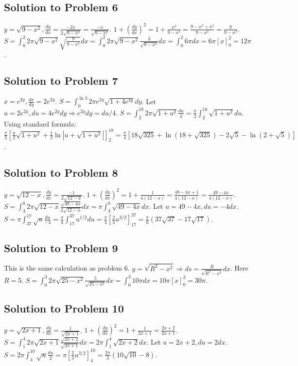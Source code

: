 \documentclass[12pt]{article}
\begin{document}
\subsection*{Solution to Problem 6}
$y=\sqrt{9-x^2}, \frac{dy}{dx}=\frac{-2x}{2\sqrt{9-x^2}}=\frac{-x}{\sqrt{9-x^2}}$.
$1+(\frac{dy}{dx})^2 = 1+\frac{x^2}{9-x^2}=\frac{9-x^2+x^2}{9-x^2}=\frac{9}{9-x^2}$.
$S = \int_0^2 2\pi \sqrt{9-x^2} \sqrt{\frac{9}{9-x^2}} dx = \int_0^2 2\pi \sqrt{9-x^2} \frac{3}{\sqrt{9-x^2}} dx = \int_0^2 6\pi dx = 6\pi[x]_0^2 = 12\pi$.

\subsection*{Solution to Problem 7}
$x=e^{2y}, \frac{dx}{dy}=2e^{2y}$. $S = \int_0^{\ln 3} 2\pi e^{2y} \sqrt{1+4e^{4y}} dy$.
Let $u=2e^{2y}, du=4e^{2y}dy \Rightarrow e^{2y}dy = du/4$. $S = \int_{2}^{18} 2\pi \sqrt{1+u^2} \frac{du}{4} = \frac{\pi}{2} \int_2^{18} \sqrt{1+u^2} du$.
Using standard formula: $\frac{\pi}{2} \left[\frac{u}{2}\sqrt{1+u^2} + \frac{1}{2}\ln|u+\sqrt{1+u^2}|\right]_2^{18} = \frac{\pi}{4}[18\sqrt{325}+\ln(18+\sqrt{325}) - 2\sqrt{5}-\ln(2+\sqrt{5})]$.

\subsection*{Solution to Problem 8}
$y=\sqrt{12-x}, \frac{dy}{dx}=\frac{-1}{2\sqrt{12-x}}$. $1+(\frac{dy}{dx})^2 = 1+\frac{1}{4(12-x)} = \frac{48-4x+1}{4(12-x)} = \frac{49-4x}{4(12-x)}$.
$S = \int_3^8 2\pi \sqrt{12-x} \frac{\sqrt{49-4x}}{2\sqrt{12-x}} dx = \pi \int_3^8 \sqrt{49-4x} dx$.
Let $u=49-4x, du=-4dx$. $S = \pi \int_{37}^{17} \sqrt{u} \frac{du}{-4} = \frac{\pi}{4} \int_{17}^{37} u^{1/2} du = \frac{\pi}{4}[\frac{2}{3}u^{3/2}]_{17}^{37} = \frac{\pi}{6}(37\sqrt{37}-17\sqrt{17})$.

\subsection*{Solution to Problem 9}
This is the same calculation as problem 6. $y=\sqrt{R^2-x^2} \Rightarrow ds = \frac{R}{\sqrt{R^2-x^2}}dx$. Here $R=5$.
$S = \int_0^3 2\pi \sqrt{25-x^2} \frac{5}{\sqrt{25-x^2}} dx = \int_0^3 10\pi dx = 10\pi[x]_0^3 = 30\pi$.

\subsection*{Solution to Problem 10}
$y=\sqrt{2x+1}, \frac{dy}{dx}=\frac{1}{\sqrt{2x+1}}$. $1+(\frac{dy}{dx})^2 = 1+\frac{1}{2x+1} = \frac{2x+2}{2x+1}$.
$S = \int_1^4 2\pi \sqrt{2x+1} \frac{\sqrt{2x+2}}{\sqrt{2x+1}} dx = 2\pi \int_1^4 \sqrt{2x+2} dx$.
Let $u=2x+2, du=2dx$. $S=2\pi \int_4^{10} \sqrt{u}\frac{du}{2} = \pi [\frac{2}{3}u^{3/2}]_4^{10} = \frac{2\pi}{3}(10\sqrt{10}-8)$.
\end{document}
